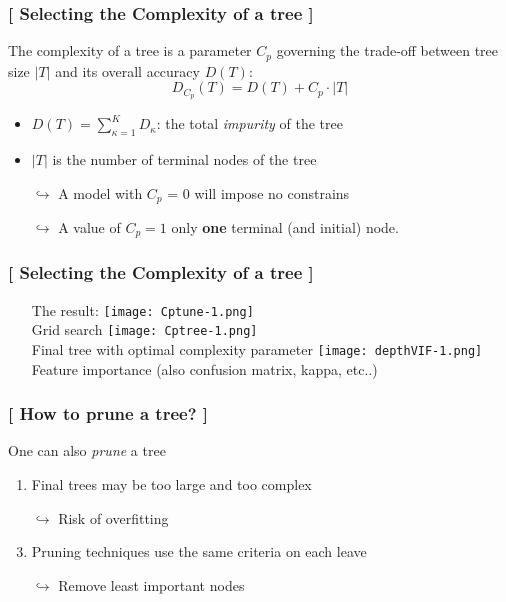 \documentclass[xcolor=x11names,compress, handhouts]{beamer}
\renewcommand{\(}{\begin{columns}}
\renewcommand{\)}{\end{columns}}
\newcommand{\<}[1]{\begin{column}{#1}}
\renewcommand{\>}{\end{column}}
\begin{document}
\begin{frame}
\frametitle{\textcolor{brique}{[ Selecting the \textbf{Complexity} of a tree ]}}
The complexity of a tree is a parameter $C_p$ governing the trade-off between tree size $|T|$ and its overall
accuracy $D(T)$:
$$
D_{C_p}(T) = D(T) + C_p \cdot |T|
$$
\begin{itemize}[<+->]
    \item  $D(T) =  \sum_{\kappa=1}^{K} D_{\kappa}$:  the total \emph{impurity} of the tree
    \item $|T|$ is the number of terminal nodes of the tree
    \item[$\hookrightarrow$] A model with $C_p$ = 0 will impose no constrains
    \item[$\hookrightarrow$] A value of $C_p = 1$ only \textbf{one} terminal (and initial) node.
\end{itemize}
\end{frame}


\begin{frame}
\frametitle{\textcolor{brique}{[ Selecting the \textbf{Complexity} of a tree ]}}
\pause
\begin{itemize}
\item[] The result:
    {\texttt{[image: Cptune-1.png]} \\ }
    {Grid search}
    {\texttt{[image: Cptree-1.png]} \\ }
    {Final tree with optimal complexity parameter}
   {\texttt{[image: depthVIF-1.png]} \\ }
   {Feature importance (also confusion matrix, kappa, etc..)}
\end{itemize}
\end{frame}


\begin{frame}
\frametitle{\textcolor{brique}{[ How to \textbf{prune} a tree? ]}}
One can also \textit{prune} a tree
\pause
\begin{enumerate}[<+->]
    \item Final trees may be too large and too complex
    \item[$\hookrightarrow$] Risk of overfitting
    \item Pruning techniques use the same criteria on each leave
    \item[$\hookrightarrow$] Remove least important nodes
\end{enumerate}
\end{frame}
\end{document}
